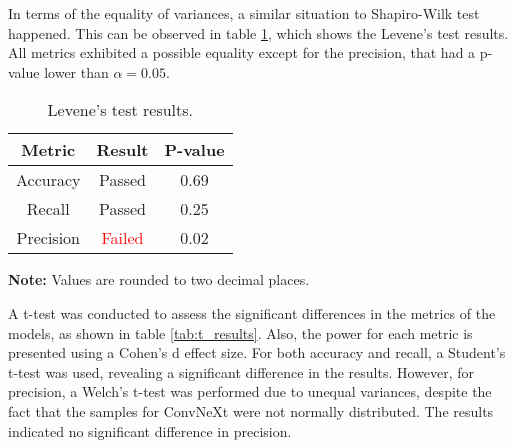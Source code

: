 
In terms of the equality of variances, a similar situation to Shapiro-Wilk test happened. This can be observed in table \ref{tab:levene_results}, which shows the Levene's test results. All metrics exhibited a possible equality except for the precision, that had a p-value lower than $\alpha = 0.05$.

\begin{table}[h]
    \centering
    \caption{Levene's test results.}
    \renewcommand{\arraystretch}{1.5}
    \begin{tabular}{|c|c|c|}
        \hline
        \textbf{Metric} & \textbf{Result} & \textbf{P-value} \\ \hline
        Accuracy & Passed & 0.69 \\ \hline
        Recall & Passed & 0.25 \\ \hline
        Precision & \textcolor{red}{Failed} & 0.02 \\ \hline
    \end{tabular}
    \begin{center}
        \parbox{\columnwidth}{\centering \footnotesize \textbf{Note:} Values are rounded to two decimal places.}
    \end{center}
\label{tab:levene_results}
\end{table}


A t-test was conducted to assess the significant differences in the metrics of the models, as shown in table \ref{tab:t_results}. Also, the power for each metric is presented using a Cohen's d effect size. For both accuracy and recall, a Student's t-test was used, revealing a significant difference in the results. However, for precision, a Welch's t-test was performed due to unequal variances, despite the fact that the samples for ConvNeXt were not normally distributed. The results indicated no significant difference in precision.

